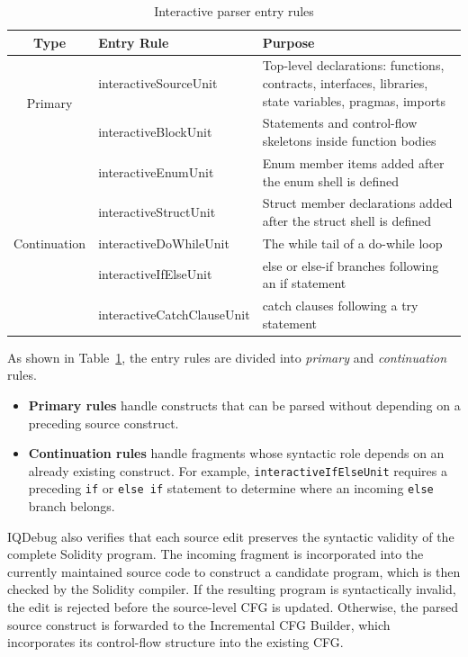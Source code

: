 \documentclass[11pt,oneside]{report}
\theoremstyle{plain}
\theoremstyle{definition}
\theoremstyle{remark}
\begin{document}
\begin{table}[!t]
\centering
\caption{Interactive parser entry rules}
\label{tab:interactive-rules}
\small
\begin{tabular}{@{}c|lp{6.7cm}@{}}
\toprule
\textbf{Type} & \textbf{Entry Rule} & \textbf{Purpose} \\
\midrule
\multirow{2}{*}[-10pt]{Primary} & interactiveSourceUnit & Top-level declarations: functions, contracts, interfaces, libraries, state variables, pragmas, imports \\
& interactiveBlockUnit & Statements and control-flow skeletons inside function bodies \\
\midrule
\multirow{5}{*}[-8pt]{Continuation} & interactiveEnumUnit & Enum member items added after the enum shell is defined \\
& interactiveStructUnit & Struct member declarations added after the struct shell is defined \\
& interactiveDoWhileUnit & The while tail of a do-while loop \\
& interactiveIfElseUnit & else or else-if branches following an if statement \\
& interactiveCatchClauseUnit & catch clauses following a try statement \\
\bottomrule
\end{tabular}
\end{table}

As shown in Table~\ref{tab:interactive-rules}, the entry rules are divided into \textit{primary} and \textit{continuation} rules.

\begin{itemize}
  \item \textbf{Primary rules} handle constructs that can be parsed without depending on a preceding source construct.

  \item \textbf{Continuation rules} handle fragments whose syntactic role depends on an already existing construct. For example, \texttt{interactiveIfElseUnit} requires a preceding \texttt{if} or \texttt{else if} statement to determine where an incoming \texttt{else} branch belongs.
\end{itemize}

IQDebug also verifies that each source edit preserves the syntactic validity of the complete Solidity program.
The incoming fragment is incorporated into the currently maintained source code to construct a candidate program, which is then checked by the Solidity compiler.
If the resulting program is syntactically invalid, the edit is rejected before the source-level CFG is updated.
Otherwise, the parsed source construct is forwarded to the Incremental CFG Builder, which incorporates its control-flow structure into the existing CFG.
\end{document}
